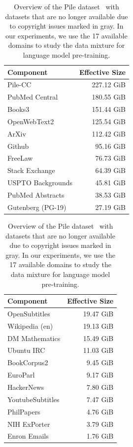 \begin{table}[tb]
\centering
\small
\caption{Overview of the Pile dataset~\citep{the_pile_corpus} with datasets that are no longer available due to copyright issues marked in gray. In our experiments, we use the 17 available domains to study the data mixture for language model pre-training.}
\vspace{1mm}
\label{table:pile_overview}
\begin{tabular}{lr}
\toprule
\textbf{Component} & \textbf{Effective Size} \\
\midrule
Pile-CC  & 227.12 GiB  \\
PubMed Central & 180.55 GiB \\
\rowcolor{gray!25} Books3 & 151.44 GiB \\
\rowcolor{gray!25} OpenWebText2 & 125.54 GiB\\
ArXiv & 112.42 GiB \\
Github & 95.16 GiB\\
FreeLaw & 76.73 GiB \\
Stack Exchange & 64.39 GiB \\
USPTO Backgrounds & 45.81 GiB \\
PubMed Abstracts & 38.53 GiB \\
Gutenberg (PG-19) & 27.19 GiB \\
\bottomrule
\end{tabular}
\hspace{5mm}
\begin{tabular}{lr}
\toprule
\textbf{Component} & \textbf{Effective Size} \\
\midrule
\rowcolor{gray!25} OpenSubtitles & 19.47 GiB \\
Wikipedia (en) & 19.13 GiB \\
DM Mathematics  & 15.49 GiB \\
Ubuntu IRC & 11.03 GiB \\
\rowcolor{gray!25} BookCorpus2 & 9.45 GiB \\
EuroParl & 9.17 GiB \\
HackerNews & 7.80 GiB \\
\rowcolor{gray!25} YoutubeSubtitles & 7.47 GiB \\
PhilPapers & 4.76 GiB  \\
NIH ExPorter & 3.79 GiB  \\
Enron Emails & 1.76 GiB \\
\bottomrule
\end{tabular}
\vspace{-4mm}
\end{table}

